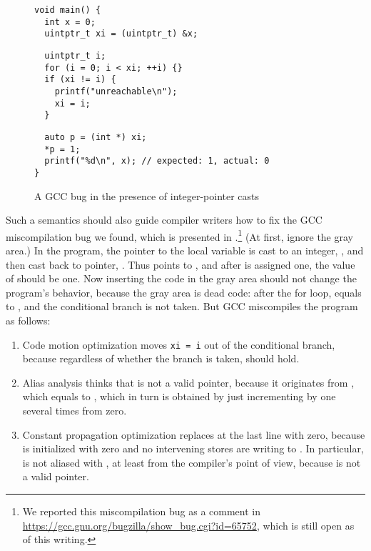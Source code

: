 \begin{figure}[t]
\begin{center}
\small
\begin{minipage}{0.5\textwidth}
\begin{verbatim}
void main() { 
  int x = 0;
  uintptr_t xi = (uintptr_t) &x;
\end{verbatim}
\vskip -0.7cm
\begin{verbatim}
  uintptr_t i;
  for (i = 0; i < xi; ++i) {}
  if (xi != i) {
    printf("unreachable\n");
    xi = i;
  }
\end{verbatim}
\vskip -0.7cm
\begin{verbatim}
  auto p = (int *) xi;
  *p = 1;
  printf("%d\n", x); // expected: 1, actual: 0
}
\end{verbatim}
\end{minipage}
\end{center}
\caption{A GCC bug in the presence of integer-pointer casts}
\label{fig:intptrcast-introduction:bug}
\end{figure}

Such a semantics should also guide compiler writers how to fix the GCC miscompilation bug we found,
which is presented in .\footnote{We reported this
  miscompilation bug as a comment in \url{https://gcc.gnu.org/bugzilla/show_bug.cgi?id=65752}, which
  is still open as of this writing.}  (At first, ignore the gray area.)  In the program, the pointer
to the local variable  is cast to an integer, , and then cast back to pointer,
.  Thus  points to , and after  is assigned one, the value of
 should be one.  Now inserting the code in the gray area should not change the program's
behavior, because the gray area is dead code: after the for loop,  equals to , and
the conditional branch is not taken.  But GCC miscompiles the program as follows:
%
\begin{enumerate}
\item Code motion optimization moves \texttt{xi = i} out of the conditional branch, because
  regardless of whether the branch is taken,  should hold.
\item Alias analysis thinks that  is not a valid pointer, because it originates from
  , which equals to , which in turn is obtained by just incrementing by one several
  times from zero.
\item Constant propagation optimization replaces  at the last line with zero, because
   is initialized with zero and no intervening stores are writing to .  In
  particular,  is not aliased with , at least from the compiler's point of view,
  because  is not a valid pointer.
\end{enumerate}
%

